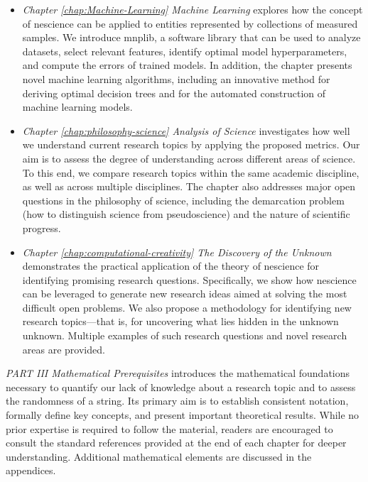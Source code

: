 \begin{itemize}

\item \emph{Chapter \ref{chap:Machine-Learning} Machine Learning} explores how the concept of nescience can be applied to entities represented by collections of measured samples. We introduce mnplib, a software library that can be used to analyze datasets, select relevant features, identify optimal model hyperparameters, and compute the errors of trained models. In addition, the chapter presents novel machine learning algorithms, including an innovative method for deriving optimal decision trees and for the automated construction of machine learning models.

\item \emph{Chapter \ref{chap:philosophy-science} Analysis of Science} investigates how well we understand current research topics by applying the proposed metrics. Our aim is to assess the degree of understanding across different areas of science. To this end, we compare research topics within the same academic discipline, as well as across multiple disciplines. The chapter also addresses major open questions in the philosophy of science, including the demarcation problem (how to distinguish science from pseudoscience) and the nature of scientific progress.

\item \emph{Chapter \ref{chap:computational-creativity} The Discovery of the Unknown} demonstrates the practical application of the theory of nescience for identifying promising research questions. Specifically, we show how nescience can be leveraged to generate new research ideas aimed at solving the most difficult open problems. We also propose a methodology for identifying new research topics—that is, for uncovering what lies hidden in the unknown unknown. Multiple examples of such research questions and novel research areas are provided.

\end{itemize}

\bigskip

\emph{PART III Mathematical Prerequisites}  introduces the mathematical foundations necessary to quantify our lack of knowledge about a research topic and to assess the randomness of a string. Its primary aim is to establish consistent notation, formally define key concepts, and present important theoretical results. While no prior expertise is required to follow the material, readers are encouraged to consult the standard references provided at the end of each chapter for deeper understanding. Additional mathematical elements are discussed in the appendices.

